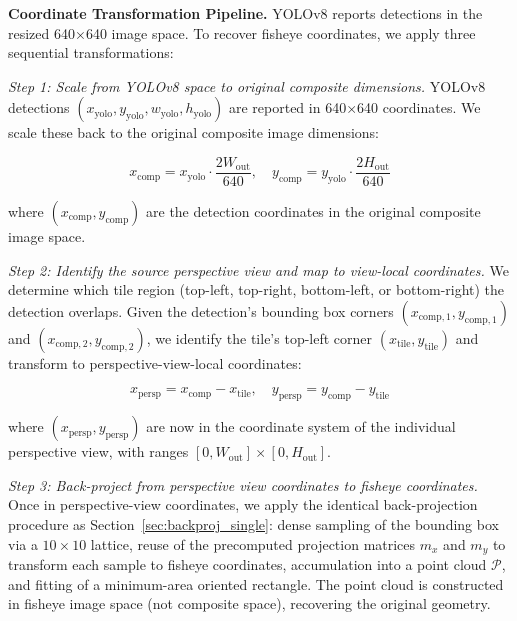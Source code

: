 \documentclass[twocolumn]{svjour3}          %
\begin{document}
\noindent
\textbf{Coordinate Transformation Pipeline.}
YOLOv8 reports detections in the resized 640×640 image space. To recover fisheye coordinates, we apply three sequential transformations:

\noindent
\textit{Step 1: Scale from YOLOv8 space to original composite dimensions.} YOLOv8 detections $(x_{\text{yolo}}, y_{\text{yolo}}, w_{\text{yolo}}, h_{\text{yolo}})$ are reported in 640×640 coordinates. We scale these back to the original composite image dimensions:

\begin{equation}
	x_{\text{comp}} = x_{\text{yolo}} \cdot \frac{2W_{\text{out}}}{640}, \quad y_{\text{comp}} = y_{\text{yolo}} \cdot \frac{2H_{\text{out}}}{640}
	\label{eq:yolo_to_composite}
\end{equation}

where $(x_{\text{comp}}, y_{\text{comp}})$ are the detection coordinates in the original composite image space.

\noindent
\textit{Step 2: Identify the source perspective view and map to view-local coordinates.} We determine which tile region (top-left, top-right, bottom-left, or bottom-right) the detection overlaps. Given the detection's bounding box corners $(x_{\text{comp},1}, y_{\text{comp},1})$ and $(x_{\text{comp},2}, y_{\text{comp},2})$, we identify the tile's top-left corner $(x_{\text{tile}}, y_{\text{tile}})$ and transform to perspective-view-local coordinates:

\begin{equation}
	x_{\text{persp}} = x_{\text{comp}} - x_{\text{tile}}, \quad y_{\text{persp}} = y_{\text{comp}} - y_{\text{tile}}
	\label{eq:composite_to_persp}
\end{equation}

where $(x_{\text{persp}}, y_{\text{persp}})$ are now in the coordinate system of the individual perspective view, with ranges $[0, W_{\text{out}}] \times [0, H_{\text{out}}]$.

\noindent
\textit{Step 3: Back-project from perspective view coordinates to fisheye coordinates.} Once in perspective-view coordinates, we apply the identical back-projection procedure as Section~\ref{sec:backproj_single}: dense sampling of the bounding box via a $10 \times 10$ lattice, reuse of the precomputed projection matrices $m_x$ and $m_y$ to transform each sample to fisheye coordinates, accumulation into a point cloud $\mathcal{P}$, and fitting of a minimum-area oriented rectangle. The point cloud is constructed in fisheye image space (not composite space), recovering the original geometry.
\end{document}

